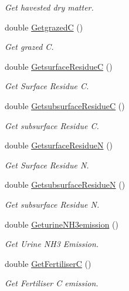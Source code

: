 \begin{DoxyCompactItemize}
\begin{DoxyCompactList}\small\item\em Get havested dry matter. \end{DoxyCompactList}\item 
double \mbox{\hyperlink{class_crop_class_a9f531980e408497281cad53ff637324f}{GetgrazedC}} ()
\begin{DoxyCompactList}\small\item\em Get grazed C. \end{DoxyCompactList}\item 
double \mbox{\hyperlink{class_crop_class_adb323588ad9c0b3d83af2192892d41df}{Getsurface\+ResidueC}} ()
\begin{DoxyCompactList}\small\item\em Get Surface Residue C. \end{DoxyCompactList}\item 
double \mbox{\hyperlink{class_crop_class_a8d6aa777ea43f923f12ea3410f9d960c}{Getsubsurface\+ResidueC}} ()
\begin{DoxyCompactList}\small\item\em Get subsurface Residue C. \end{DoxyCompactList}\item 
double \mbox{\hyperlink{class_crop_class_a356b34eb080b9625637b13b21b9aa3b4}{Getsurface\+ResidueN}} ()
\begin{DoxyCompactList}\small\item\em Get Surface Residue N. \end{DoxyCompactList}\item 
double \mbox{\hyperlink{class_crop_class_a5d4011116dc6a849e041a8fa6fb0a84b}{Getsubsurface\+ResidueN}} ()
\begin{DoxyCompactList}\small\item\em Get subsurface Residue N. \end{DoxyCompactList}\item 
double \mbox{\hyperlink{class_crop_class_a5dcc42d890c15f6dc26d88c19e9a362c}{Geturine\+N\+H3emission}} ()
\begin{DoxyCompactList}\small\item\em Get Urine N\+H3 Emission. \end{DoxyCompactList}\item 
double \mbox{\hyperlink{class_crop_class_a323d6d6e84c6c6648dafc2add80fa343}{Get\+FertiliserC}} ()
\begin{DoxyCompactList}\small\item\em Get Fertiliser C emission. \end{DoxyCompactList}\item 

\end{DoxyCompactItemize}
